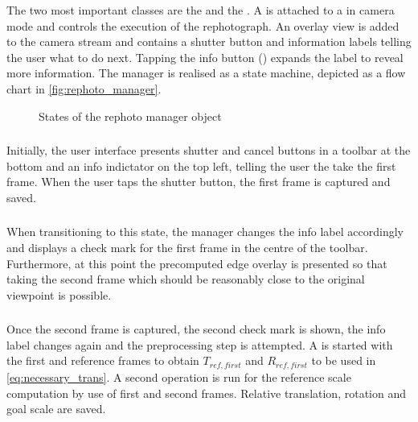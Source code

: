  The two most
important classes are the  and the
. A  is attached to
a  in camera mode and controls the execution of
the rephotograph. An overlay view is added to the camera stream and contains a
shutter button and information labels telling the user what to do next. Tapping
the info button ()
expands the label to reveal more information. The manager is realised as a state
machine, depicted as a flow chart in \autoref{fig:rephoto_manager}.

\begin{figure}[h]
   {\centering      
      
      \caption{States of the rephoto manager object}
   \label{fig:rephoto_manager}}
\end{figure}

\subsubsection*{}

Initially, the user interface presents shutter and cancel buttons in a toolbar
at the bottom and an info indictator on the top left, telling the user the take
the first frame. When the user taps the shutter button, the first frame is
captured and saved.

\subsubsection*{}

When transitioning to this state, the manager changes the info label accordingly
and displays a check mark for the first frame in the centre of the toolbar.
Furthermore, at this point the precomputed edge overlay is presented so that
taking the second frame which should be reasonably close to the original
viewpoint is possible.

\subsubsection*{}

Once the second frame is captured, the second check mark is shown, the info
label changes again and the preprocessing step is attempted. A
 is started with the first and reference
frames to obtain $T_{ref,first}$ and $R_{ref,first}$ to be used in
\eqref{eq:necessary_trans}. A second operation is run for the reference scale
computation by use of first and second frames. Relative translation, rotation
and goal scale are saved.


